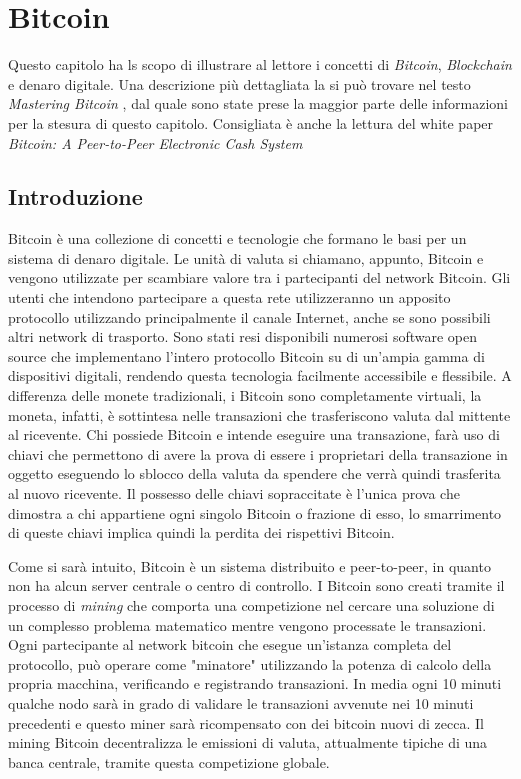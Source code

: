
\chapter{Bitcoin}
\label{bitcoin-chapter}
Questo capitolo ha ls scopo di illustrare al lettore i concetti di \textit{Bitcoin}, \textit{Blockchain} e denaro digitale. Una descrizione più dettagliata la si può trovare nel testo \textit{Mastering Bitcoin} \cite{mastering:andreas}, dal quale sono state prese la maggior parte delle informazioni per la stesura di questo capitolo. Consigliata è anche la lettura del white paper \textit{Bitcoin: A Peer-to-Peer Electronic Cash System} \cite{paper-bitcoin:satoshi}

\section{Introduzione}
Bitcoin è una collezione di concetti e tecnologie che formano le basi per un sistema di denaro digitale. Le unità di valuta si chiamano, appunto, Bitcoin e vengono utilizzate per scambiare valore tra i partecipanti del network Bitcoin. Gli utenti che intendono partecipare a questa rete utilizzeranno un apposito protocollo utilizzando principalmente il canale Internet, anche se sono possibili altri network di trasporto. Sono stati resi disponibili numerosi software open source che implementano l'intero protocollo Bitcoin su di un'ampia gamma di dispositivi digitali, rendendo questa tecnologia facilmente accessibile e flessibile. A differenza delle monete tradizionali, i Bitcoin sono completamente virtuali, la moneta, infatti, è sottintesa nelle transazioni che trasferiscono valuta dal mittente al ricevente. Chi possiede Bitcoin e intende eseguire una transazione, farà uso di chiavi che permettono di avere la prova di essere i proprietari della transazione in oggetto eseguendo lo sblocco della valuta da spendere che verrà quindi trasferita al nuovo ricevente. Il possesso delle chiavi sopraccitate è l'unica prova che dimostra a chi appartiene ogni singolo Bitcoin o frazione di esso, lo smarrimento di queste chiavi implica quindi la perdita dei rispettivi Bitcoin.

Come si sarà intuito, Bitcoin è un sistema distribuito e peer-to-peer, in quanto non ha alcun server centrale o centro di controllo. I Bitcoin sono creati tramite il processo di \textit{mining} che comporta una competizione nel cercare una soluzione di un complesso problema matematico mentre vengono processate le transazioni. Ogni partecipante al network bitcoin che esegue un'istanza completa del protocollo,  può operare come "minatore" utilizzando la potenza di calcolo della propria macchina, verificando e registrando transazioni. In media ogni 10 minuti qualche nodo sarà in grado di validare le transazioni avvenute nei 10 minuti precedenti e questo miner sarà ricompensato con dei bitcoin nuovi di zecca. Il mining Bitcoin decentralizza le emissioni di valuta, attualmente tipiche di una banca centrale, tramite questa competizione globale.

